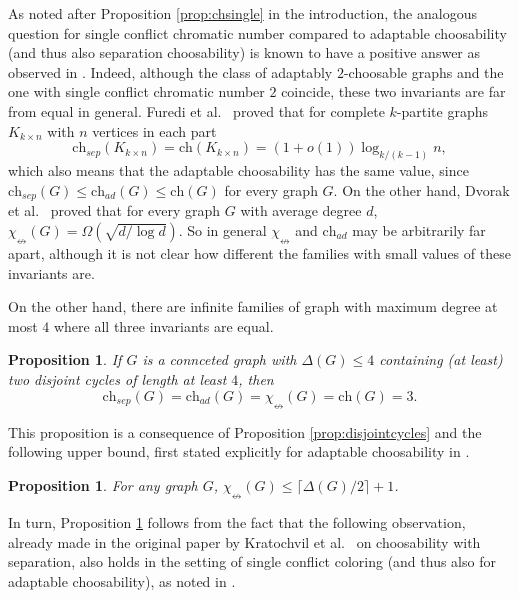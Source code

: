 \documentclass[12pt]{article}
\newtheorem{proposition}[theorem]{Proposition}
\newcommand{\single}{\chi_{\nleftrightarrow}}
\newcommand{\ch}{\mathrm{ch}}
\begin{document}
As noted after Proposition \ref{prop:chsingle} in the introduction, the analogous question for single 
conflict chromatic number compared to
adaptable choosability (and thus also separation choosability) 
is known to have a positive answer as observed in 
\cite{DvorakEsperetKangOzeki}.
Indeed, although the class of adaptably $2$-choosable graphs and the one with
	single conflict chromatic number $2$ coincide, these two invariants are far from equal in general.
	Furedi et al.\ \cite{FurediKostochkaKumbhat} proved that for
	complete $k$-partite graphs $K_{k\times n}$ with $n$ vertices in each part
	$$\ch_{sep}(K_{k\times n}) =\ch(K_{k\times n}) = 
	(1+o(1))\log_{k/(k-1)} n,$$
	which also means that the adaptable choosability has the same value, since
	$\ch_{sep}(G) \leq \ch_{ad} (G) \leq \ch(G)$ for every graph $G$.
	On the other hand, Dvorak et al.\ \cite{DvorakEsperetKangOzeki} proved that
	for every graph $G$ with average degree $d$, 
	$\single(G) = \Omega(\sqrt{d/\log d})$.
	So in general $\single$ and $\ch_{ad}$ may be arbitrarily far apart, although
	it is not clear how different the families with small values of 
	these invariants are. 






\bigskip


On the other hand, there are infinite families of graph with maximum degree at most $4$
where all three invariants are equal.

\begin{proposition}
\label{prop:all3}
	If $G$ is a connceted graph with $\Delta(G) \leq 4$ containing (at least)
	two disjoint cycles of length at least $4$, then
	$$\ch_{sep}(G)=\ch_{ad}(G) = \single(G)= \ch(G)=3.$$
\end{proposition}

This proposition is a consequence of Proposition \ref{prop:disjointcycles} and 
the following upper bound, first stated explicitly for adaptable choosability in \cite{KostochkaZhu}.

\begin{proposition}
\label{prop:maxdeg}
	For any graph $G$, $\single(G) \leq \lceil \Delta(G)/2 \rceil +1$.
\end{proposition}

In turn, Proposition \ref{prop:maxdeg} follows from the fact that the following observation, already made in the
original paper by Kratochvil et al.\ \cite{KratochvilTuzaVoigt} on choosability with separation, 
also holds in the setting of single conflict coloring (and thus also for adaptable choosability),
as noted in \cite{DvorakEsperetKangOzeki}.
\end{document}
